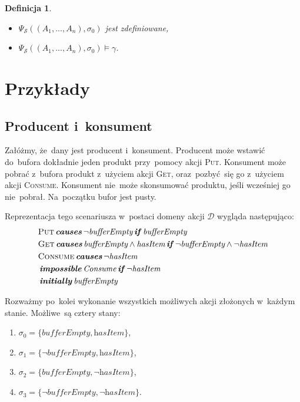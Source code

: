 \documentclass[11pt,a4paper]{article}
\newtheorem{defn}{Definicja}
\DeclareMathOperator{\Initially}{\textbf{\textit{initially}}}
\DeclareMathOperator{\Causes}{\textbf{\textit{causes}}}
\DeclareMathOperator{\If}{\textbf{\textit{if}}}
\DeclareMathOperator{\Impossible}{\textbf{\textit{impossible}}}
\begin{document}
\begin{defn}
\begin{enumerate}
        \begin{itemize}
            \item $\Psi_\mathcal{S}((A_1,...,A_n),\sigma_{0})$ jest zdefiniowane,
            \item $\Psi_\mathcal{S}((A_1,...,A_n),\sigma_{0}) \models \gamma$.
        \end{itemize}
    \end{enumerate}
\end{defn}

\section{Przykłady}

\subsection{Producent i~konsument}

Załóżmy, że~dany jest producent i~konsument.
Producent może wstawić do~bufora dokładnie jeden produkt przy~pomocy akcji \textsc{Put}.
Konsument może pobrać z~bufora produkt z~użyciem akcji \textsc{Get},
oraz~pozbyć~się go z~użyciem akcji \textsc{Consume}.
Konsument nie~może skonsumować produktu, jeśli wcześniej go nie~pobrał.
Na~początku bufor jest pusty.

Reprezentacja tego scenariusza w~postaci domeny akcji $\mathcal{D}$ wygląda następująco:
\begin{align*}
    & \textsc{Put} \Causes \neg \textit{bufferEmpty} \If \textit{bufferEmpty} \\
    & \textsc{Get} \Causes \textit{bufferEmpty} \land \textit{hasItem} \If \neg \textit{bufferEmpty} \land \neg \textit{hasItem} \\
    & \textsc{Consume} \Causes \neg \textit{hasItem} \\
    & \Impossible \textit{Consume} \If \neg \textit{hasItem} \\
    & \Initially \textit{bufferEmpty}
\end{align*}

Rozważmy po~kolei wykonanie wszystkich możliwych akcji złożonych w~każdym stanie. Możliwe~są cztery stany:

\begin{enumerate}
    \item $\sigma_0 = \{ \textit{bufferEmpty}, \textit{hasItem} \}$,
    \item $\sigma_1 = \{ \neg \textit{bufferEmpty}, \textit{hasItem} \}$,
    \item $\sigma_2 = \{ \textit{bufferEmpty}, \neg \textit{hasItem} \}$,
    \item $\sigma_3 = \{ \neg \textit{bufferEmpty}, \neg \textit{hasItem} \}$.
\end{enumerate}
\end{document}
